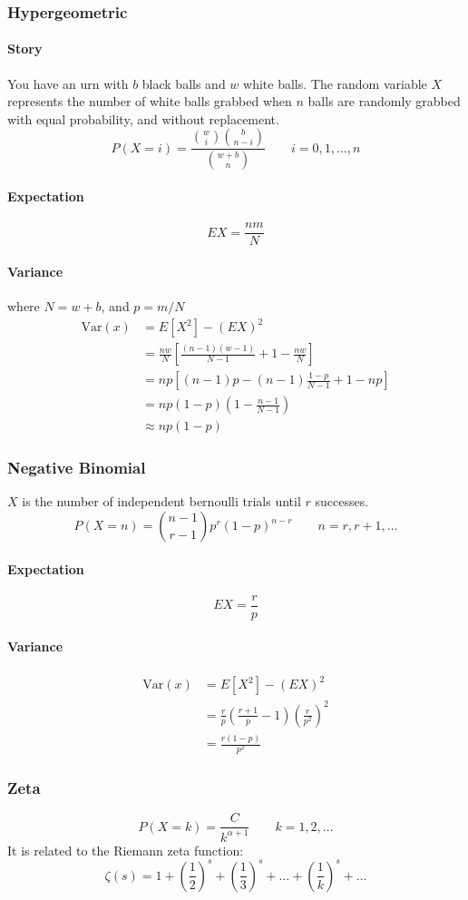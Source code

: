 \subsubsection{Hypergeometric}
\paragraph{Story}
You have an urn with $b$ black balls and $w$ white balls. The random variable $X$ represents the number of white balls grabbed when $n$ balls are randomly grabbed with equal probability, and without replacement.
$$P(X=i) = \frac{\binom{w}{i}\binom{b}{n-i}}{\binom{w+b}{n}} \qquad i=0,1,\dots,n $$

\paragraph{Expectation}
$$EX = \frac{nm}{N}$$

\paragraph{Variance} where $N=w+b$, and $p=m/N$
    \begin{equation*}
    \begin{aligned}
        \text{Var}(x) &= E[X^2] - (EX)^2 \\
                      &= \frac{nw}{N}[\frac{(n-1)(w-1)}{N-1}+1-\frac{nw}{N}] \\
                      &= np[(n-1)p-(n-1)\frac{1-p}{N-1}+1-np] \\
                      &= np(1-p)(1-\frac{n-1}{N-1}) \\
                      &\approx np(1-p) 
    \end{aligned}
    \end{equation*}

\subsubsection{Negative Binomial}
$X$ is the number of independent bernoulli trials until $r$ successes.
$$P(X=n) = \binom{n-1}{r-1}p^r(1-p)^{n-r} \qquad n=r,r+1,\dots$$

\paragraph{Expectation}
$$EX = \frac{r}{p}$$

\paragraph{Variance}
    \begin{equation*}
    \begin{aligned}
        \text{Var}(x) &= E[X^2] - (EX)^2 \\
                      &= \frac{r}{p}(\frac{r+1}{p}-1) (\frac{r}{p^2})^2 \\
                      &= \frac{r(1-p)}{p^2}
    \end{aligned}
    \end{equation*}

\subsubsection{Zeta}
$$P(X=k)=\frac{C}{k^{\alpha+1}} \qquad k=1,2,\dots$$
It is related to the Riemann zeta function:
$$\zeta(s) = 1 + (\frac{1}{2})^s + (\frac{1}{3})^s + \dots + (\frac{1}{k})^s + \dots$$

